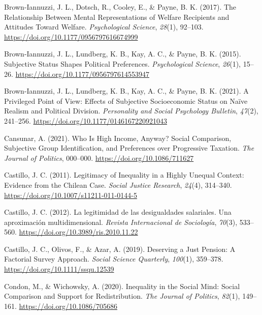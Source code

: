 \documentclass[
  12pt,
]{book}
\newlength{\cslhangindent}
\newlength{\cslentryspacingunit} %
\newenvironment{CSLReferences}[2] %
 {%
  \setlength{\parindent}{0pt}
  \ifodd #1
  \let\oldpar\par
  \def\par{\hangindent=\cslhangindent\oldpar}
  \fi
  \setlength{\parskip}{#2\cslentryspacingunit}
 }%
 {}
\begin{document}
\begin{CSLReferences}{1}{0}
\leavevmode{}%
Brown-Iannuzzi, J. L., Dotsch, R., Cooley, E., \& Payne, B. K. (2017). The {Relationship Between Mental Representations} of {Welfare Recipients} and {Attitudes Toward Welfare}. \emph{Psychological Science}, \emph{28}(1), 92--103. \url{https://doi.org/10.1177/0956797616674999}

\leavevmode{}%
Brown-Iannuzzi, J. L., Lundberg, K. B., Kay, A. C., \& Payne, B. K. (2015). Subjective {Status Shapes Political Preferences}. \emph{Psychological Science}, \emph{26}(1), 15--26. \url{https://doi.org/10.1177/0956797614553947}

\leavevmode{}%
Brown-Iannuzzi, J. L., Lundberg, K. B., Kay, A. C., \& Payne, B. K. (2021). A {Privileged Point} of {View}: {Effects} of {Subjective Socioeconomic Status} on {Naïve Realism} and {Political Division}. \emph{Personality and Social Psychology Bulletin}, \emph{47}(2), 241--256. \url{https://doi.org/10.1177/0146167220921043}

\leavevmode{}%
Cansunar, A. (2021). Who {Is High Income}, {Anyway}? {Social Comparison}, {Subjective Group Identification}, and {Preferences} over {Progressive Taxation}. \emph{The Journal of Politics}, 000--000. \url{https://doi.org/10.1086/711627}

\leavevmode{}%
Castillo, J. C. (2011). Legitimacy of {Inequality} in a {Highly Unequal Context}: {Evidence} from the {Chilean Case}. \emph{Social Justice Research}, \emph{24}(4), 314--340. \url{https://doi.org/10.1007/s11211-011-0144-5}

\leavevmode{}%
Castillo, J. C. (2012). La legitimidad de las desigualdades salariales. {Una} aproximación multidimensional. \emph{Revista Internacional de Sociología}, \emph{70}(3), 533--560. \url{https://doi.org/10.3989/ris.2010.11.22}

\leavevmode{}%
Castillo, J. C., Olivos, F., \& Azar, A. (2019). Deserving a {Just Pension}: {A Factorial Survey Approach}. \emph{Social Science Quarterly}, \emph{100}(1), 359--378. \url{https://doi.org/10.1111/ssqu.12539}

\leavevmode{}%
Condon, M., \& Wichowsky, A. (2020). Inequality in the {Social Mind}: {Social Comparison} and {Support} for {Redistribution}. \emph{The Journal of Politics}, \emph{82}(1), 149--161. \url{https://doi.org/10.1086/705686}


\end{CSLReferences}
\end{document}
